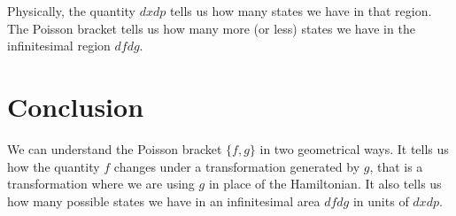 \documentclass[aps,pra,10pt,floatfix,nofootinbib]{revtex4-1}
\theoremstyle{definition}
\begin{document}
Physically, the quantity $dxdp$ tells us how many states we have in that region. The Poisson bracket tells us how many more (or less) states we have in the infinitesimal region $dfdg$.

\section{Conclusion}

We can understand the Poisson bracket $\{f,g\}$ in two geometrical ways. It tells us how the quantity $f$ changes under a transformation generated by $g$, that is a transformation where we are using $g$ in place of the Hamiltonian. It also tells us how many possible states we have in an infinitesimal area $df dg$ in units of $dx dp$.
\end{document}
